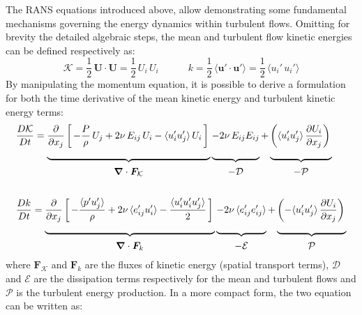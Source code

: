 \documentclass[12pt, a4paper, twoside, openright]{book}
\begin{document}
The RANS equations introduced above, allow demonstrating some fundamental mechanisms governing the energy dynamics within turbulent flows. Omitting for brevity the detailed algebraic steps, the mean and turbulent flow kinetic energies can be defined respectively as:
\begin{equation}
	\mathcal{K} = \frac{1}{2} \, \bm{U} \cdot \bm{U} = \frac{1}{2} \, U_i \, U_i  \qquad \quad k = \frac{1}{2} \, \langle \bm{u}' \cdot \bm{u}' \rangle = \frac{1}{2} \, \langle u_i' \, u_i' \rangle
	\label{eq:kinetic-energy}
\end{equation}
By manipulating the momentum equation, it is possible to derive a formulation for both the time derivative of the mean kinetic energy and turbulent kinetic energy terms:
\begin{align}
	 & \frac{D \mathcal{K}}{Dt} =
	\underbrace{ \frac{\partial}{\partial x_j} \left[ \, -\frac{P}{\rho} \, U_j + 2\nu \, E_{ij} \, U_i - \langle u_i' u_j' \rangle \, U_i \, \right] \rule[-18pt]{0pt}{0pt} }_{\raisebox{-6pt}{$\bm{\nabla} \cdot \bm{F}_{\mathcal{K}}$}}
	\underbrace{ - 2\nu \, E_{ij} E_{ij} \vphantom{\frac{\partial}{\partial x_j} \left[ \frac{P}{\rho} \right]} \rule[-18pt]{0pt}{0pt} }_{\raisebox{-6pt}{$-\mathcal{D}$}}
	+ \underbrace{ \left( \langle u_i' u_j' \rangle \, \frac{\partial U_i}{\partial x_j} \right) \vphantom{\frac{\partial}{\partial x_j} \left[ \frac{P}{\rho} \right]} \rule[-18pt]{0pt}{0pt} }_{\raisebox{-6pt}{$-\mathcal{P}$}} \\[4ex]
	 & \frac{D k}{D t} =
	\underbrace{ \frac{\partial}{\partial x_j} \left[ \, -\frac{\langle p' u_j' \rangle}{\rho} + 2\nu \, \langle e_{ij}' u_i' \rangle - \frac{\langle u_i' u_i' u_j' \rangle}{2} \, \right] \vphantom{\frac{\partial}{\partial x_j} \left[ \frac{P}{\rho} \right]} \rule[-18pt]{0pt}{0pt} }_{\raisebox{-6pt}{$\bm{\nabla} \cdot \bm{F}_k$}}
	\underbrace{ - 2\nu \, \langle e_{ij}' e_{ij}' \rangle \vphantom{\frac{\partial}{\partial x_j} \left[ \frac{P}{\rho} \right]} \rule[-18pt]{0pt}{0pt} }_{\raisebox{-6pt}{$-\mathcal{E}$}}
	+ \underbrace{ \left( - \langle u_i' u_j' \rangle \, \frac{\partial U_i}{\partial x_j} \right) \vphantom{\frac{\partial}{\partial x_j} \left[ \frac{P}{\rho} \right]} \rule[-18pt]{0pt}{0pt} }_{\raisebox{-6pt}{$\mathcal{P}$}}
\end{align}
where $\bm{F}_{\mathcal{K}}$ and $\bm{F}_{k}$ are the fluxes of kinetic energy (spatial transport terms), $\mathcal{D}$ and $\mathcal{E}$ are the dissipation terms respectively for the mean and turbulent flows and $\mathcal{P}$ is the turbulent energy production. In a more compact form, the two equation can be written as:
\end{document}
